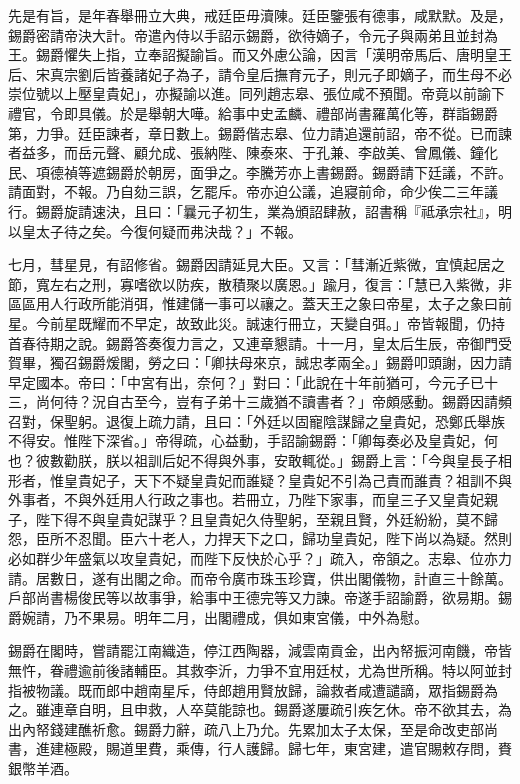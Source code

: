 \begin{pinyinscope}
先是有旨，是年春舉冊立大典，戒廷臣毋瀆陳。廷臣鑒張有德事，咸默默。及是，錫爵密請帝決大計。帝遣內侍以手詔示錫爵，欲待嫡子，令元子與兩弟且並封為王。錫爵懼失上指，立奉詔擬諭旨。而又外慮公論，因言「漢明帝馬后、唐明皇王后、宋真宗劉后皆養諸妃子為子，請令皇后撫育元子，則元子即嫡子，而生母不必崇位號以上壓皇貴妃」，亦擬諭以進。同列趙志皋、張位咸不預聞。帝竟以前諭下禮官，令即具儀。於是舉朝大嘩。給事中史孟麟、禮部尚書羅萬化等，群詣錫爵第，力爭。廷臣諫者，章日數上。錫爵偕志皋、位力請追還前詔，帝不從。已而諫者益多，而岳元聲、顧允成、張納陛、陳泰來、于孔兼、李啟美、曾鳳儀、鐘化民、項德禎等遮錫爵於朝房，面爭之。李騰芳亦上書錫爵。錫爵請下廷議，不許。請面對，不報。乃自劾三誤，乞罷斥。帝亦迫公議，追寢前命，命少俟二三年議行。錫爵旋請速決，且曰：「曩元子初生，業為頒詔肆赦，詔書稱『祗承宗社』，明以皇太子待之矣。今復何疑而弗決哉？」不報。

七月，彗星見，有詔修省。錫爵因請延見大臣。又言：「彗漸近紫微，宜慎起居之節，寬左右之刑，寡嗜欲以防疾，散積聚以廣恩。」踰月，復言：「慧已入紫微，非區區用人行政所能消弭，惟建儲一事可以禳之。蓋天王之象曰帝星，太子之象曰前星。今前星既耀而不早定，故致此災。誠速行冊立，天變自弭。」帝皆報聞，仍持首春待期之說。錫爵答奏復力言之，又連章懇請。十一月，皇太后生辰，帝御門受賀畢，獨召錫爵煖閣，勞之曰：「卿扶母來京，誠忠孝兩全。」錫爵叩頭謝，因力請早定國本。帝曰：「中宮有出，奈何？」對曰：「此說在十年前猶可，今元子已十三，尚何待？況自古至今，豈有子弟十三歲猶不讀書者？」帝頗感動。錫爵因請頻召對，保聖躬。退復上疏力請，且曰：「外廷以固寵陰謀歸之皇貴妃，恐鄭氏舉族不得安。惟陛下深省。」帝得疏，心益動，手詔諭錫爵：「卿每奏必及皇貴妃，何也？彼數勸朕，朕以祖訓后妃不得與外事，安敢輒從。」錫爵上言：「今與皇長子相形者，惟皇貴妃子，天下不疑皇貴妃而誰疑？皇貴妃不引為己責而誰責？祖訓不與外事者，不與外廷用人行政之事也。若冊立，乃陛下家事，而皇三子又皇貴妃親子，陛下得不與皇貴妃謀乎？且皇貴妃久侍聖躬，至親且賢，外廷紛紛，莫不歸怨，臣所不忍聞。臣六十老人，力捍天下之口，歸功皇貴妃，陛下尚以為疑。然則必如群少年盛氣以攻皇貴妃，而陛下反快於心乎？」疏入，帝頷之。志皋、位亦力請。居數日，遂有出閣之命。而帝令廣市珠玉珍寶，供出閣儀物，計直三十餘萬。戶部尚書楊俊民等以故事爭，給事中王德完等又力諫。帝遂手詔諭爵，欲易期。錫爵婉請，乃不果易。明年二月，出閣禮成，俱如東宮儀，中外為慰。

錫爵在閣時，嘗請罷江南織造，停江西陶器，減雲南貢金，出內帑振河南饑，帝皆無忤，眷禮逾前後諸輔臣。其救李沂，力爭不宜用廷杖，尤為世所稱。特以阿並封指被物議。既而郎中趙南星斥，侍郎趙用賢放歸，論救者咸遭譴謫，眾指錫爵為之。雖連章自明，且申救，人卒莫能諒也。錫爵遂屢疏引疾乞休。帝不欲其去，為出內帑錢建醮祈愈。錫爵力辭，疏八上乃允。先累加太子太保，至是命改吏部尚書，進建極殿，賜道里費，乘傳，行人護歸。歸七年，東宮建，遣官賜敕存問，賚銀幣羊酒。


\end{pinyinscope}
